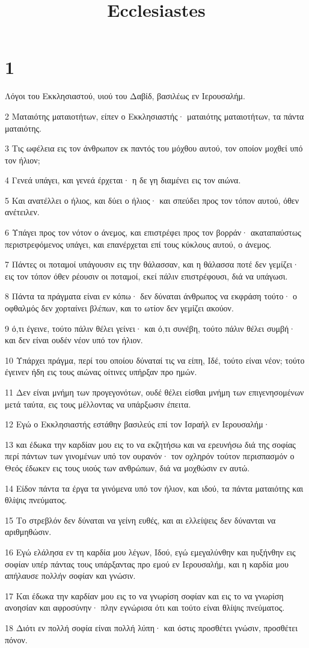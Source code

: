 

\title{Ecclesiastes}


\chapter{1}

\par Λόγοι του Εκκλησιαστού, υιού του Δαβίδ, βασιλέως εν Ιερουσαλήμ.
\par 2 Ματαιότης ματαιοτήτων, είπεν ο Εκκλησιαστής· ματαιότης ματαιοτήτων, τα πάντα ματαιότης.
\par 3 Τις ωφέλεια εις τον άνθρωπον εκ παντός του μόχθου αυτού, τον οποίον μοχθεί υπό τον ήλιον;
\par 4 Γενεά υπάγει, και γενεά έρχεται· η δε γη διαμένει εις τον αιώνα.
\par 5 Και ανατέλλει ο ήλιος, και δύει ο ήλιος· και σπεύδει προς τον τόπον αυτού, όθεν ανέτειλεν.
\par 6 Υπάγει προς τον νότον ο άνεμος, και επιστρέφει προς τον βορράν· ακαταπαύστως περιστρεφόμενος υπάγει, και επανέρχεται επί τους κύκλους αυτού, ο άνεμος.
\par 7 Πάντες οι ποταμοί υπάγουσιν εις την θάλασσαν, και η θάλασσα ποτέ δεν γεμίζει· εις τον τόπον όθεν ρέουσιν οι ποταμοί, εκεί πάλιν επιστρέφουσι, διά να υπάγωσι.
\par 8 Πάντα τα πράγματα είναι εν κόπω· δεν δύναται άνθρωπος να εκφράση τούτο· ο οφθαλμός δεν χορταίνει βλέπων, και το ωτίον δεν γεμίζει ακούον.
\par 9 ό,τι έγεινε, τούτο πάλιν θέλει γείνει· και ό,τι συνέβη, τούτο πάλιν θέλει συμβή· και δεν είναι ουδέν νέον υπό τον ήλιον.
\par 10 Υπάρχει πράγμα, περί του οποίου δύναταί τις να είπη, Ιδέ, τούτο είναι νέον; τούτο έγεινεν ήδη εις τους αιώνας οίτινες υπήρξαν προ ημών.
\par 11 Δεν είναι μνήμη των προγεγονότων, ουδέ θέλει είσθαι μνήμη των επιγενησομένων μετά ταύτα, εις τους μέλλοντας να υπάρξωσιν έπειτα.
\par 12 Εγώ ο Εκκλησιαστής εστάθην βασιλεύς επί τον Ισραήλ εν Ιερουσαλήμ·
\par 13 και έδωκα την καρδίαν μου εις το να εκζητήσω και να ερευνήσω διά της σοφίας περί πάντων των γινομένων υπό τον ουρανόν· τον οχληρόν τούτον περισπασμόν ο Θεός έδωκεν εις τους υιούς των ανθρώπων, διά να μοχθώσιν εν αυτώ.
\par 14 Είδον πάντα τα έργα τα γινόμενα υπό τον ήλιον, και ιδού, τα πάντα ματαιότης και θλίψις πνεύματος.
\par 15 Το στρεβλόν δεν δύναται να γείνη ευθές, και αι ελλείψεις δεν δύνανται να αριθμηθώσιν.
\par 16 Εγώ ελάλησα εν τη καρδία μου λέγων, Ιδού, εγώ εμεγαλύνθην και ηυξήνθην εις σοφίαν υπέρ πάντας τους υπάρξαντας προ εμού εν Ιερουσαλήμ, και η καρδία μου απήλαυσε πολλήν σοφίαν και γνώσιν.
\par 17 Και έδωκα την καρδίαν μου εις το να γνωρίση σοφίαν και εις το να γνωρίση ανοησίαν και αφροσύνην· πλην εγνώρισα ότι και τούτο είναι θλίψις πνεύματος.
\par 18 Διότι εν πολλή σοφία είναι πολλή λύπη· και όστις προσθέτει γνώσιν, προσθέτει πόνον.

